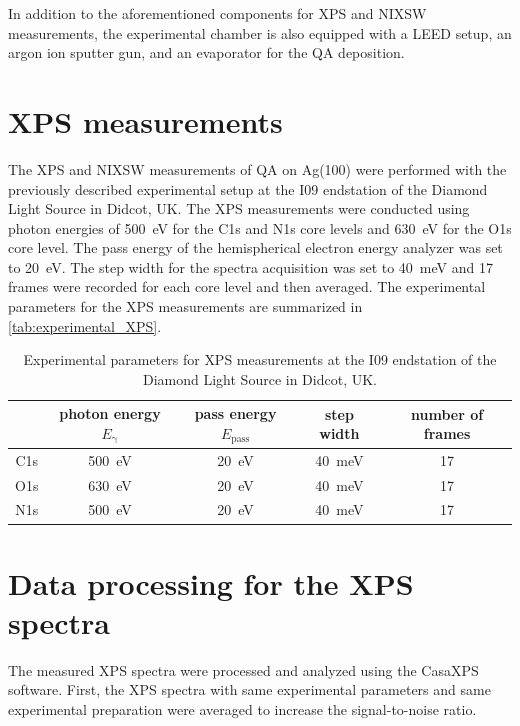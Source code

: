In addition to the aforementioned components for \ac{XPS} and \ac{NIXSW} measurements, the experimental chamber is also equipped with a \ac{LEED} setup, an argon ion sputter gun, and an evaporator for the \ac{QA} deposition.\autocite{Diamond2025} 


\section{XPS measurements}

The \ac{XPS} and \ac{NIXSW} measurements of \ac{QA} on Ag(100) were performed with the previously described experimental setup at the I09 endstation of the Diamond Light Source in Didcot, UK. The \ac{XPS} measurements were conducted using photon energies of 500~\si{\eV} for the C1s and N1s core levels and 630~\si{\eV} for the O1s core level. The pass energy of the hemispherical electron energy analyzer was set to 20~\si{\eV}. The step width for the spectra acquisition was set to 40~\si{meV} and 17 frames were recorded for each core level and then averaged. The experimental parameters for the \ac{XPS} measurements are summarized in \autoref{tab:experimental_XPS}.

\begin{table}[H]
	\centering
	\caption{Experimental parameters for \ac{XPS} measurements at the I09 endstation of the Diamond Light Source in Didcot, UK.}
	\begin{tabular}{@{}ccccc@{}} \toprule
		& photon energy $E_\mathrm{\gamma}$ & pass energy $E_\mathrm{pass}$ & step width & number of frames \\
		\midrule
		C1s & 500~\si{\eV} & 20~\si{\eV} & 40~\si{meV} & 17 \\ 
		O1s & 630~\si{\eV} & 20~\si{\eV} & 40~\si{meV} & 17 \\ 
		N1s & 500~\si{\eV} & 20~\si{\eV} & 40~\si{meV} & 17 \\
		\bottomrule
	\end{tabular}
	\label{tab:experimental_XPS}
\end{table}

\section{Data processing for the XPS spectra}
\label{sec:data-processing-XPS}

The measured \ac{XPS} spectra were processed and analyzed using the CasaXPS software\autocite{CasaSoftwareLtd2022}. First, the \ac{XPS} spectra with same experimental parameters and same experimental preparation were averaged to increase the signal-to-noise ratio.

